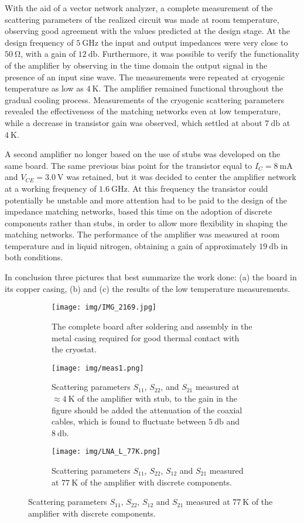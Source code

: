 \documentclass[12pt]{article}
\begin{document}
With the aid of a vector network analyzer, a complete measurement of the scattering parameters of the realized circuit was made at room temperature, observing good agreement with the values predicted at the design stage. At the design frequency of $\SI{5}{\giga\hertz}$ the input and output impedances were very close to $\SI{50}{\ohm}$, with a gain of $\SI{12}{\decibel}$. Furthermore, it was possible to verify the functionality of the amplifier by observing in the time domain the output signal in the presence of an input sine wave. The measurements were repeated at cryogenic temperature as low as $\SI{4}{\kelvin}$. The amplifier remained functional throughout the gradual cooling process. Measurements of the cryogenic scattering parameters revealed the effectiveness of the matching networks even at low temperature, while a decrease in transistor gain was observed, which settled at about $\SI{7}{\decibel}$ at $\SI{4}{\kelvin}$.

A second amplifier no longer based on the use of stubs was developed on the same board. The same previous bias point for the transistor equal to $I_{C}=\SI{8}{\milli\ampere}$ and $V_{CE}=\SI{3.0}{\volt}$ was retained, but it was decided to center the amplifier network at a working frequency of $\SI{1.6}{\giga\hertz}$. At this frequency the transistor could potentially be unstable and more attention had to be paid to the design of the impedance matching networks, based this time on the adoption of discrete components rather than stubs, in order to allow more flexibility in shaping the matching networks. The performance of the amplifier was measured at room temperature and in liquid nitrogen, obtaining a gain of approximately $\SI{19}{\decibel}$ in both conditions.

In conclusion three pictures that best summarize the work done: (a) the board in its copper casing, (b) and (c) the results of the low temperature measurements.
\begin{figure}[H]
    \centering
    \begin{subfigure}[t]{0.3\textwidth}
        \centering
        \texttt{[image: img/IMG\_2169.jpg]}
        \caption{The complete board after soldering and assembly in the metal casing required for good thermal contact with the cryostat.}
    \end{subfigure}
    \hfill
    \begin{subfigure}[t]{0.33\textwidth}
        \centering
        \texttt{[image: img/meas1.png]}
        \caption{Scattering parameters $S_{11}$, $S_{22}$, and $S_{21}$ measured at $\approx\SI{4}{\kelvin}$ of the amplifier with stub, to the gain in the figure should be added the attenuation of the coaxial cables, which is found to fluctuate between $\SI{5}{\decibel}$ and $\SI{8}{\decibel}$.}
    \end{subfigure}
    \hfill
    \begin{subfigure}[t]{0.33\textwidth}
        \centering
        \texttt{[image: img/LNA\_L\_77K.png]}
        \caption{Scattering parameters $S_{11}$, $S_{22}$, $S_{12}$ and $S_{21}$ measured at $\SI{77}{\kelvin}$ of the amplifier with discrete components.}
    \end{subfigure}
\end{figure}
\end{document}
